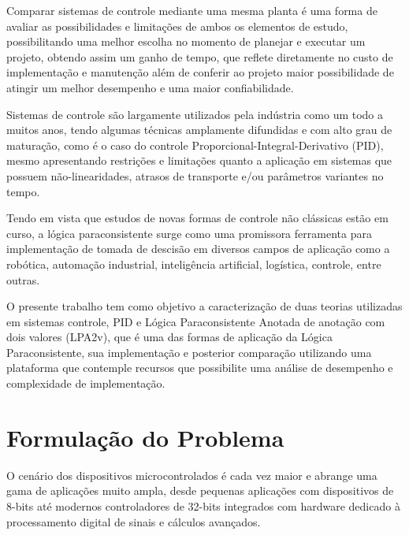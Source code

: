 Comparar sistemas de controle mediante uma mesma planta é uma forma de avaliar as possibilidades e limitações de ambos os elementos de estudo, possibilitando uma melhor escolha no momento de planejar e executar um projeto, obtendo assim um ganho de tempo, que reflete diretamente no custo de implementação e manutenção além de conferir ao projeto maior possibilidade de atingir um melhor desempenho e uma maior confiabilidade. 

Sistemas de controle são largamente utilizados pela indústria como um todo a muitos anos, tendo algumas técnicas amplamente difundidas e com alto grau de maturação, como é o caso do controle Proporcional-Integral-Derivativo (PID),  mesmo apresentando restrições e limitações quanto a aplicação em sistemas que possuem não-linearidades, atrasos de transporte e/ou parâmetros variantes no tempo.\cite{Ferreira2012}



Tendo em vista que estudos de novas formas de controle não clássicas estão em curso, a lógica paraconsistente surge como uma promissora ferramenta para implementação de tomada de descisão em diversos campos de aplicação como a robótica, automação industrial, inteligência artificial, logística, controle, entre outras.\cite{JoaoInacio}
 
O presente trabalho tem como objetivo a caracterização de duas teorias utilizadas em sistemas controle, PID e Lógica Paraconsistente Anotada de anotação com dois valores (LPA2v), que é uma das formas de aplicação da Lógica Paraconsistente, sua implementação e posterior comparação utilizando uma plataforma que contemple recursos que possibilite uma análise de desempenho e complexidade de implementação.


\section{Formulação do Problema}
O cenário dos dispositivos microcontrolados é cada vez maior e abrange uma gama de aplicações muito ampla, desde pequenas aplicações com dispositivos de 8-bits até modernos controladores de 32-bits integrados com hardware dedicado à processamento digital de sinais e cálculos avançados.

